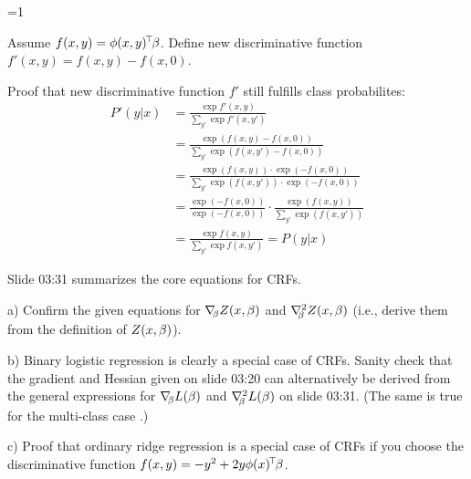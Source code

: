 \ifnum\value{solutions}=1
\begin{solution}
	Assume $f(x, y) = \phi(x, y)^\T\beta$. Define new discriminative function $f'(x, y) = f(x, y) - f(x, 0)$.
	
	Proof that new discriminative function $f'$ still fulfills class probabilites:
	\begin{align*}
		P'(y|x)
		&= \frac{\exp f'(x, y)}{\sum_{y'}\exp f'(x, y')} \\
		&= \frac{\exp (f(x, y) - f(x, 0))}{\sum_{y'}\exp (f(x, y') - f(x, 0))} \\
		&= \frac{\exp (f(x, y)) \cdot \exp (-f(x, 0))}{\sum_{y'}\exp (f(x, y')) \cdot \exp (-f(x, 0))} \\
		&= \frac{\exp (-f(x, 0))}{\exp (-f(x, 0))} \cdot \frac{\exp (f(x, y))}{\sum_{y'}\exp (f(x, y'))} \\
		&= \frac{\exp f(x, y)}{\sum_{y'}\exp f(x, y')} 
		= P(y|x)
	\end{align*}
\end{solution}
\fi



Slide 03:31 summarizes the core equations for CRFs.

a) Confirm the given equations for $\na_\b Z(x,\b)$ and $\he[\b]
Z(x,\b)$ (i.e., derive them from the definition of $Z(x,\b)$).

b) Binary logistic regression is clearly a special case of
CRFs. Sanity check that the gradient and Hessian given on slide 03:20
can alternatively be derived from the general expressions for $\na_\b L(\b)$ and
$\he[\b] L(\b)$ on slide 03:31. (The same is true for the multi-class case .)

c) Proof that ordinary ridge regression is a special case of CRFs if
you choose the discriminative function $f(x,y) = - y^2 + 2 y \phi(x)^\T \b$.

